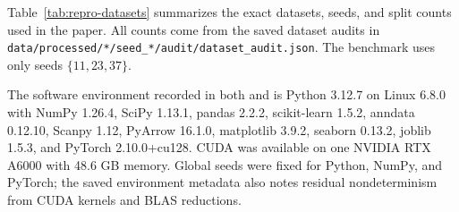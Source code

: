 \documentclass{article}
\begin{document}
Table~\ref{tab:repro-datasets} summarizes the exact datasets, seeds, and split counts used in the paper. All counts come from the saved dataset audits in \texttt{data/processed/*/seed\_*/audit/dataset\_audit.json}. The benchmark uses only seeds $\{11,23,37\}$.

\begin{table}[t]
\caption{Reproducibility summary for the exact benchmark assets used in this paper. Split counts are identical across seeds for a given dataset; the active residual PCA dimensionality differs because Adamson has lower rank than the fixed 64-dimensional cap.}
\label{tab:repro-datasets}
\centering
\small
{}
\end{table}

The software environment recorded in both  and  is Python 3.12.7 on Linux 6.8.0 with NumPy 1.26.4, SciPy 1.13.1, pandas 2.2.2, scikit-learn 1.5.2, anndata 0.12.10, Scanpy 1.12, PyArrow 16.1.0, matplotlib 3.9.2, seaborn 0.13.2, joblib 1.5.3, and PyTorch 2.10.0+cu128. CUDA was available on one NVIDIA RTX A6000 with 48.6 GB memory. Global seeds were fixed for Python, NumPy, and PyTorch; the saved environment metadata also notes residual nondeterminism from CUDA kernels and BLAS reductions.
\end{document}
